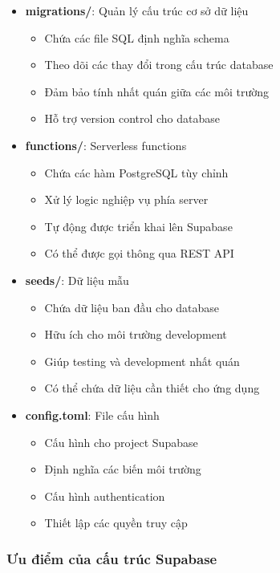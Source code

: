 \documentclass[a4paper]{report}
\begin{document}
\begin{itemize}
    \item \textbf{migrations/}: Quản lý cấu trúc cơ sở dữ liệu
    \begin{itemize}
        \item Chứa các file SQL định nghĩa schema
        \item Theo dõi các thay đổi trong cấu trúc database
        \item Đảm bảo tính nhất quán giữa các môi trường
        \item Hỗ trợ version control cho database
    \end{itemize}

    \item \textbf{functions/}: Serverless functions
    \begin{itemize}
        \item Chứa các hàm PostgreSQL tùy chỉnh
        \item Xử lý logic nghiệp vụ phía server
        \item Tự động được triển khai lên Supabase
        \item Có thể được gọi thông qua REST API
    \end{itemize}

    \item \textbf{seeds/}: Dữ liệu mẫu
    \begin{itemize}
        \item Chứa dữ liệu ban đầu cho database
        \item Hữu ích cho môi trường development
        \item Giúp testing và development nhất quán
        \item Có thể chứa dữ liệu cần thiết cho ứng dụng
    \end{itemize}

    \item \textbf{config.toml}: File cấu hình
    \begin{itemize}
        \item Cấu hình cho project Supabase
        \item Định nghĩa các biến môi trường
        \item Cấu hình authentication
        \item Thiết lập các quyền truy cập
    \end{itemize}
\end{itemize}

\subsubsection{Ưu điểm của cấu trúc Supabase}
\end{document}
